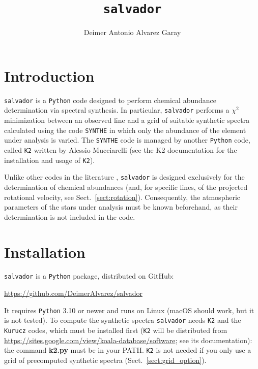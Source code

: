 \documentclass[modern]{aastex701}
\begin{document}
\title{\texttt{salvador}}


\author[orcid=0000-0002-9156-0729]{Deimer Antonio Alvarez Garay}
\email[show]{\textcolor{magenta}{deimer.alvarez@inaf.it}}  




\section{Introduction} 
\hrulefill

\texttt{salvador} is a \texttt{Python} code designed to perform chemical abundance determination via spectral synthesis. In particular, \texttt{salvador} performs a $\chi^2$ minimization between an observed line and a grid of suitable synthetic spectra calculated using the code \texttt{SYNTHE} \citep{kurucz_05} in which only the abundance of the element under analysis is varied. The \texttt{SYNTHE} code is managed by another \texttt{Python} code, called \texttt{K2} written by Alessio Mucciarelli (see the K2 documentation for the installation and usage of \texttt{K2}). 

Unlike other codes in the literature \citep[e.g.;][]{magrini_13,sbordone_14,blanco_cuaresma_14}, \texttt{salvador} is designed exclusively for the determination of chemical abundances (and, for specific lines, of the projected rotational velocity, see Sect.~\ref{sect:rotation}). Consequently, the atmospheric parameters of the stars under analysis must be known beforehand, as their determination is not included in the code.


\section{Installation}
\hrulefill

\texttt{salvador} is a \texttt{Python} package, distributed on GitHub:
\begin{center}
    \url{https://github.com/DeimerAlvarez/salvador}
\end{center}
It requires \texttt{Python} 3.10 or newer and runs on Linux (macOS should work, but it is not tested). To compute the synthetic spectra \texttt{salvador} needs \texttt{K2} and the \texttt{Kurucz} codes, which must be installed first (\texttt{K2} will be distributed from \url{https://sites.google.com/view/koala-database/software}; see its documentation): the command {\bf k2.py} must be in your PATH. \texttt{K2} is not needed if you only use a grid of precomputed synthetic spectra (Sect.~\ref{sect:grid_option}).
\end{document}
